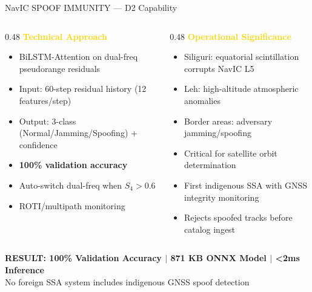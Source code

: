 \documentclass[aspectratio=169,11pt]{beamer}
\begin{document}
\begin{frame}{NavIC SPOOF IMMUNITY — D2 Capability}
\begin{columns}[T]
  \begin{column}{0.48\textwidth}
    \textcolor{gold}{\textbf{Technical Approach}}
    \begin{itemize}\small
      \item BiLSTM-Attention on dual-freq pseudorange residuals
      \item Input: 60-step residual history (12 features/step)
      \item Output: 3-class (Normal/Jamming/Spoofing) + confidence
      \item \textbf{100\% validation accuracy}
      \item Auto-switch dual-freq when $S_4 > 0.6$
      \item ROTI/multipath monitoring
    \end{itemize}
  \end{column}
  \begin{column}{0.48\textwidth}
    \textcolor{gold}{\textbf{Operational Significance}}
    \begin{itemize}\small
      \item Siliguri: equatorial scintillation corrupts NavIC L5
      \item Leh: high-altitude atmospheric anomalies
      \item Border areas: adversary jamming/spoofing
      \item Critical for satellite orbit determination
      \item First indigenous SSA with GNSS integrity monitoring
      \item Rejects spoofed tracks before catalog ingest
    \end{itemize}
  \end{column}
\end{columns}

\vspace{0.4cm}
\begin{alertblock}{}
\centering
\textbf{RESULT: 100\% Validation Accuracy \(\vert\) 871 KB ONNX Model \(\vert\) <2ms Inference}\\
\small No foreign SSA system includes indigenous GNSS spoof detection
\end{alertblock}
\end{frame}
\end{document}
